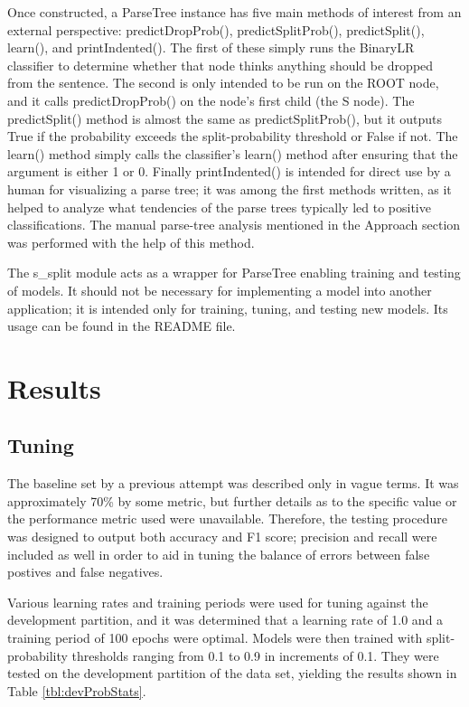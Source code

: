 \documentclass{article}
\begin{document}
Once constructed, a ParseTree instance has five main methods of interest from an external perspective: predictDropProb(), predictSplitProb(), predictSplit(), learn(), and printIndented(). The first of these simply runs the BinaryLR classifier to determine whether that node thinks anything should be dropped from the sentence. The second is only intended to be run on the ROOT node, and it calls predictDropProb() on the node's first child (the S node). The predictSplit() method is almost the same as predictSplitProb(), but it outputs True if the probability exceeds the split-probability threshold or False if not. The learn() method simply calls the classifier's learn() method after ensuring that the argument is either 1 or 0. Finally printIndented() is intended for direct use by a human for visualizing a parse tree; it was among the first methods written, as it helped to analyze what tendencies of the parse trees typically led to positive classifications. The manual parse-tree analysis mentioned in the Approach section was performed with the help of this method.

The s\_split module acts as a wrapper for ParseTree enabling training and testing of models. It should not be necessary for implementing a model into another application; it is intended only for training, tuning, and testing new models. Its usage can be found in the README file.

\clearpage



\section*{Results}

\subsection*{Tuning}

The baseline set by a previous attempt was described only in vague terms. It was approximately 70\% by some metric, but further details as to the specific value or the performance metric used were unavailable. Therefore, the testing procedure was designed to output both accuracy and F1 score; precision and recall were included as well in order to aid in tuning the balance of errors between false postives and false negatives.

Various learning rates and training periods were used for tuning against the development partition, and it was determined that a learning rate of 1.0 and a training period of 100 epochs were optimal. Models were then trained with split-probability thresholds ranging from 0.1 to 0.9 in increments of 0.1. They were tested on the development partition of the data set, yielding the results shown in Table \ref{tbl:devProbStats}.
\end{document}
